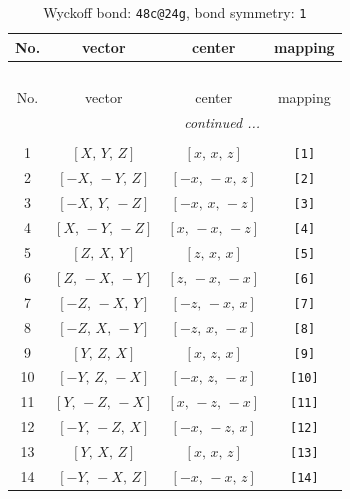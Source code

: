\documentclass[fleqn,8pt]{jsarticle}
\begin{document}
\begin{longtable}{cccc}
\caption{Wyckoff bond: {\tt 48c@24g}, bond symmetry: {\tt 1}}
 \\
 \hline \hline
No. & vector & center & mapping \\ \hline \endfirsthead

\multicolumn{3}{l}{\tablename\ \thetable{}} \\
 \hline \hline
No. & vector & center & mapping \\ \hline \endhead

 \hline \hline
\multicolumn{3}{r}{\footnotesize\it continued ...} \\ \endfoot

 \hline \hline
\multicolumn{3}{r}{} \\ \endlastfoot

1 & $\left[ X,\, Y,\, Z \right]$ & $\left[ x,\, x,\, z \right]$ & {\tt [1]} \\ \hline
2 & $\left[ - X,\, - Y,\, Z \right]$ & $\left[ - x,\, - x,\, z \right]$ & {\tt [2]} \\ \hline
3 & $\left[ - X,\, Y,\, - Z \right]$ & $\left[ - x,\, x,\, - z \right]$ & {\tt [3]} \\ \hline
4 & $\left[ X,\, - Y,\, - Z \right]$ & $\left[ x,\, - x,\, - z \right]$ & {\tt [4]} \\ \hline
5 & $\left[ Z,\, X,\, Y \right]$ & $\left[ z,\, x,\, x \right]$ & {\tt [5]} \\ \hline
6 & $\left[ Z,\, - X,\, - Y \right]$ & $\left[ z,\, - x,\, - x \right]$ & {\tt [6]} \\ \hline
7 & $\left[ - Z,\, - X,\, Y \right]$ & $\left[ - z,\, - x,\, x \right]$ & {\tt [7]} \\ \hline
8 & $\left[ - Z,\, X,\, - Y \right]$ & $\left[ - z,\, x,\, - x \right]$ & {\tt [8]} \\ \hline
9 & $\left[ Y,\, Z,\, X \right]$ & $\left[ x,\, z,\, x \right]$ & {\tt [9]} \\ \hline
10 & $\left[ - Y,\, Z,\, - X \right]$ & $\left[ - x,\, z,\, - x \right]$ & {\tt [10]} \\ \hline
11 & $\left[ Y,\, - Z,\, - X \right]$ & $\left[ x,\, - z,\, - x \right]$ & {\tt [11]} \\ \hline
12 & $\left[ - Y,\, - Z,\, X \right]$ & $\left[ - x,\, - z,\, x \right]$ & {\tt [12]} \\ \hline
13 & $\left[ Y,\, X,\, Z \right]$ & $\left[ x,\, x,\, z \right]$ & {\tt [13]} \\ \hline
14 & $\left[ - Y,\, - X,\, Z \right]$ & $\left[ - x,\, - x,\, z \right]$ & {\tt [14]} \\ \hline

\end{longtable}
\end{document}
